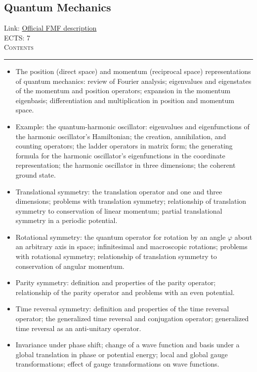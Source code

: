 \documentclass[11pt, a4paper]{article}
\newenvironment{course}[3]{
\subsection{#1}%
Link: \href{#2}{Official FMF description}\\%
ECTS: #3%
\vspace{1ex}
\\
{\large \textsc{Contents}}\\[-0.9ex]%
\rule{\textwidth}{0.5pt}
\vspace{-3ex}
}
{}
\newenvironment{chapter}[1]{
\begin{tcolorbox}[title=#1, breakable]
}
{\end{tcolorbox}}
\begin{document}
\begin{course}{Quantum Mechanics}{https://www.fmf.uni-lj.si/en/study-physics/programmes/1fiz/2020/7000777/courses/1156/}{7}
\begin{chapter}{The Dirac formalism}
\begin{itemize}
            \item The position (direct space) and momentum (reciprocal space) representations of quantum mechanics: review of Fourier analysis; eigenvalues and eigenstates of the momentum and position operators; expansion in the momentum eigenbasis; differentiation and multiplication in position and momentum space.

            \item Example: the quantum-harmonic oscillator: eigenvalues and eigenfunctions of the harmonic oscillator's Hamiltonian; the creation, annihilation, and counting operators; the ladder operators in matrix form; the generating formula for the harmonic oscillator's eigenfunctions in the coordinate representation; the harmonic oscillator in three dimensions; the coherent ground state.

        \end{itemize}
    \end{chapter}

    \begin{chapter}{Symmetries}
        
        \begin{itemize}
        
            \item Translational symmetry: the translation operator and one and three dimensions; problems with translation symmetry; relationship of translation symmetry to conservation of linear momentum; partial translational symmetry in a periodic potential.

            \item Rotational symmetry: the quantum operator for rotation by an angle $ \varphi $ about an arbitrary axis in space; infinitesimal and macroscopic rotations; problems with rotational symmetry; relationship of translation symmetry to conservation of angular momentum.

            \item Parity symmetry: definition and properties of the parity operator; relationship of the parity operator and problems with an even potential.

            \item Time reversal symmetry: definition and properties of the time reversal operator; the generalized time reversal and conjugation operator; generalized time reversal as an anti-unitary operator.

            \item Invariance under phase shift; change of a wave function and basis under a global translation in phase or potential energy; local and global gauge transformations; effect of gauge transformations on wave functions.
        

\end{itemize}
\end{chapter}
\end{course}
\end{document}
